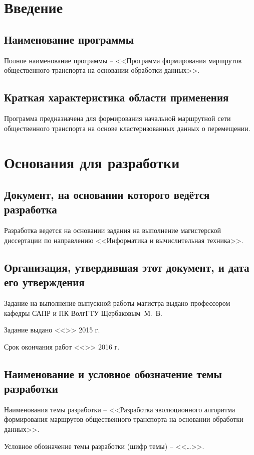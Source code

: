 \chapter{Введение}
\section{Наименование программы}
Полное наименование программы -- <<Программа формирования маршрутов 
общественного транспорта на основании обработки данных>>.

\section{Краткая характеристика области применения}
Программа предназначена для формирования начальной маршрутной сети общественного транспорта на основе 
кластеризованных данных о перемещении.

\chapter{Основания для разработки}
\section{Документ, на основании которого ведётся разработка}
Разработка ведется на основании задания на выполнение магистерской диссертации по направлению 
<<Информатика и вычислительная техника>>.

\section{Организация, утвердившая этот документ, и дата его утверждения}
Задание на выполнение выпускной работы магистра выдано профессором кафедры САПР и ПК ВолгГТУ Щербаковым~М.~В.

Задание выдано <<\LINE{1cm}>> \LINE{5cm} 2015 г.

Срок окончания работ <<\LINE{1cm}>> \LINE{5cm} 2016 г.

\section{Наименование и условное обозначение темы разработки}
Наименования темы разработки -- <<Разработка эволюционного алгоритма формирования маршрутов общественного 
транспорта на основании обработки данных>>.

Условное обозначение темы разработки (шифр темы) -- <<\ldots>>.


